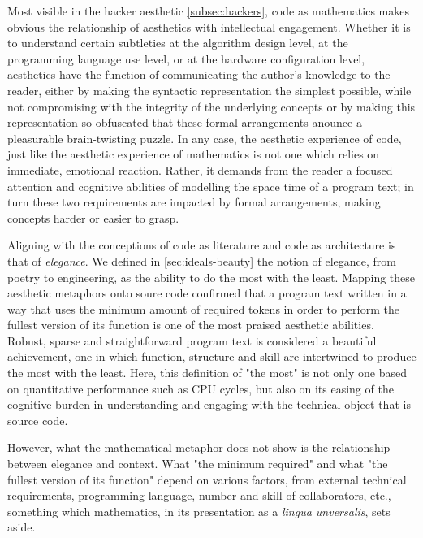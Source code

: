 Most visible in the hacker aesthetic \autoref{subsec:hackers}, code as mathematics makes obvious the relationship of aesthetics with intellectual engagement. Whether it is to understand certain subtleties at the algorithm design level, at the programming language use level, or at the hardware configuration level, aesthetics have the function of communicating the author's knowledge to the reader, either by making the syntactic representation the simplest possible, while not compromising with the integrity of the underlying concepts or by making this representation so obfuscated that these formal arrangements anounce a pleasurable brain-twisting puzzle. In any case, the aesthetic experience of code, just like the aesthetic experience of mathematics is not one which relies on immediate, emotional reaction. Rather, it demands from the reader a focused attention and cognitive abilities of modelling the space time of a program text; in turn these two requirements are impacted by formal arrangements, making concepts harder or easier to grasp.

Aligning with the conceptions of code as literature and code as architecture is that of \emph{elegance}. We defined in \autoref{sec:ideals-beauty} the notion of elegance, from poetry to engineering, as the ability to do the most with the least. Mapping these aesthetic metaphors onto soure code confirmed that a program text written in a way that uses the minimum amount of required tokens in order to perform the fullest version of its function is one of the most praised aesthetic abilities. Robust, sparse and straightforward program text is considered a beautiful achievement, one in which function, structure and skill are intertwined to produce the most with the least. Here, this definition of "the most" is not only one based on quantitative performance such as CPU cycles, but also on its easing of the cognitive burden in understanding and engaging with the technical object that is source code.

However, what the mathematical metaphor does not show is the relationship between elegance and context. What "the minimum required" and what "the fullest version of its function" depend on various factors, from external technical requirements, programming language, number and skill of collaborators, etc., something which mathematics, in its presentation as a \emph{lingua unversalis}, sets aside.

